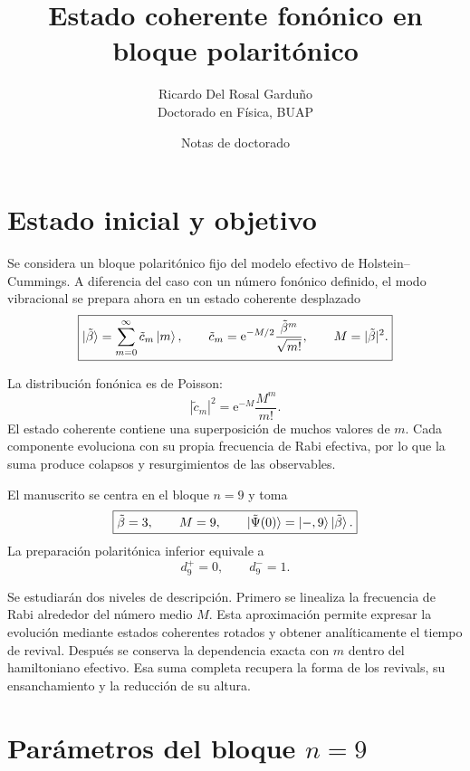 \documentclass[11pt]{article}
\title{Estado coherente fon\'onico en bloque polarit\'onico}
\author{Ricardo Del Rosal Gardu\~no \\ \small Doctorado en F\'isica, BUAP}
\date{Notas de doctorado}
\newcommand{\ee}{\mathrm{e}}
\begin{document}
\maketitle
\tableofcontents
\bigskip

\section{Estado inicial y objetivo}

Se considera un bloque polarit\'onico fijo del modelo efectivo de
Holstein--Cummings. A diferencia del caso con un n\'umero fon\'onico definido,
el modo vibracional se prepara ahora en un estado coherente desplazado
\begin{equation}
  \boxed{
  \ket{\tilde\beta}
  =
  \sum_{m=0}^{\infty}\tilde c_m\ket m,
  \qquad
  \tilde c_m
  =
  \ee^{-M/2}\frac{\tilde\beta^m}{\sqrt{m!}},
  \qquad
  M=|\tilde\beta|^2.
  }
\end{equation}


La distribuci\'on fon\'onica es de Poisson:
\begin{equation}
  \boxed{
  |\tilde c_m|^2
  =
  \ee^{-M}\frac{M^m}{m!}.
  }
\end{equation}
El estado coherente contiene una superposici\'on de muchos valores de $m$.
Cada componente evoluciona con su propia frecuencia de Rabi efectiva, por lo
que la suma produce colapsos y resurgimientos de las observables.

El manuscrito se centra en el bloque $n=9$ y toma
\begin{equation}
  \boxed{
  \tilde\beta=3,
  \qquad
  M=9,
  \qquad
  \ket{\tilde\Psi(0)}=\ket{-,9}\ket{\tilde\beta}.
  }
\end{equation}
La preparaci\'on polarit\'onica inferior equivale a
\begin{equation}
  \boxed{
  d_9^+=0,
  \qquad
  d_9^-=1.
  }
\end{equation}

Se estudiar\'an dos niveles de descripci\'on. Primero se linealiza la frecuencia
de Rabi alrededor del n\'umero medio $M$. Esta aproximaci\'on permite expresar
la evoluci\'on mediante estados coherentes rotados y obtener anal\'iticamente el
tiempo de revival. Despu\'es se conserva la dependencia exacta con $m$ dentro
del hamiltoniano efectivo. Esa suma completa recupera la forma de los revivals,
su ensanchamiento y la reducci\'on de su altura.

\section{Par\'ametros del bloque \texorpdfstring{$n=9$}{n=9}}
\end{document}

